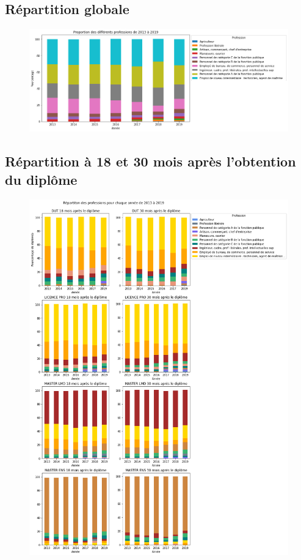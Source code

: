 \documentclass[12pt, a4paper, titlepage, table]{article}
\begin{document}
	\subsection{Répartition globale}
		\begin{figure}[H]
			\centering
			\includegraphics[width=1\textwidth]{../graphs/repartition_professions_global.png}
		\end{figure}

	\subsection{Répartition à 18 et 30 mois après l'obtention du diplôme}
\begin{figure}[H]
	\centering
	\includegraphics[width=1\textwidth]{../graphs/repartition_professions_situation.png}
\end{figure}
\end{document}
